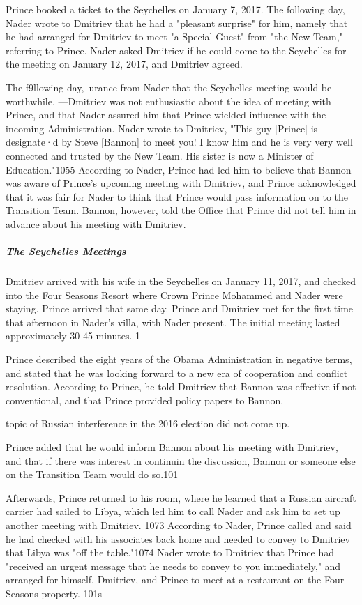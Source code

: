 Prince booked a ticket to the Seychelles on January 7, 2017.%
The following day, Nader wrote to Dmitriev that he had a "pleasant surprise" for him, namely that he had arranged for Dmitriev to meet "a Special Guest" from "the New Team," referring to Prince.%
Nader asked Dmitriev if he could come to the Seychelles for the meeting on January 12, 2017, and Dmitriev agreed.%

The f9llowing day,~urance from Nader that the Seychelles meeting would be worthwhile.%
---Dmitriev was not enthusiastic about the idea of meeting with Prince, and that Nader assured him that Prince wielded influence with the incoming Administration.%
Nader wrote to Dmitriev, "This guy [Prince] is designate·d by Steve [Bannon] to meet you! I know him and he is very very well connected and trusted by the New Team. His sister is now a Minister of Education."1055 According to Nader, Prince had led him to believe that Bannon was aware of Prince's upcoming meeting with Dmitriev, and Prince acknowledged that it was fair for Nader to think that Prince would pass information on to the Transition Team.%
Bannon, however, told the Office that Prince did not tell him in advance about his meeting with Dmitriev.%

\subparagraph{The Seychelles Meetings}

Dmitriev arrived with his wife in the Seychelles on January 11, 2017, and checked into the Four Seasons Resort where Crown Prince Mohammed and Nader were staying.%
Prince arrived that same day.%
Prince and Dmitriev met for the first time that afternoon in Nader's villa, with Nader present.%
The initial meeting lasted approximately 30-45 minutes.%
1

Prince described the eight years of the Obama Administration in negative terms, and stated that he was looking forward to a new era of cooperation and conflict resolution.%
According to Prince, he told Dmitriev that Bannon was effective if not conventional, and that Prince provided policy papers to Bannon.%

topic of Russian interference in the 2016 election did not come up.

Prince added that he would inform Bannon about his meeting with Dmitriev, and that if there was interest in continuin the discussion, Bannon or someone else on the Transition Team would do so.101

Afterwards, Prince returned to his room, where he learned that a Russian aircraft carrier had sailed to Libya, which led him to call Nader and ask him to set up another meeting with Dmitriev. 1073 According to Nader, Prince called and said he had checked with his associates back home and needed to convey to Dmitriev that Libya was "off the table."1074 Nader wrote to Dmitriev that Prince had "received an urgent message that he needs to convey to you immediately," and arranged for himself, Dmitriev, and Prince to meet at a restaurant on the Four Seasons property. 101s

